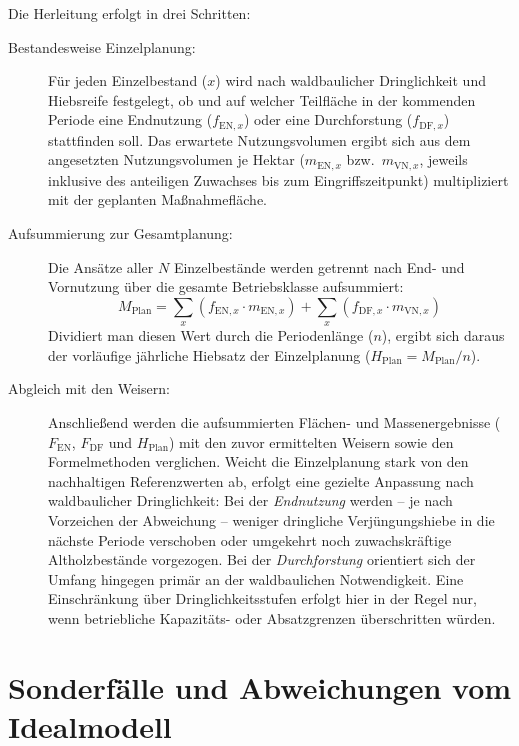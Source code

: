 \documentclass[twocolumn, paper=a4, fontsize=10pt]{scrartcl}
\begin{document}
Die Herleitung erfolgt in drei Schritten:
\begin{description}
\item[Bestandesweise Einzelplanung:] Für jeden Einzelbestand ($x$) wird nach waldbaulicher Dringlichkeit und Hiebsreife festgelegt, ob und auf welcher Teilfläche in der kommenden Periode eine Endnutzung ($f_{\text{EN},x}$) oder eine Durchforstung ($f_{\text{DF},x}$) stattfinden soll. Das erwartete Nutzungsvolumen ergibt sich aus dem angesetzten Nutzungsvolumen je Hektar ($m_{\text{EN},x}$ bzw.\ $m_{\text{VN},x}$, jeweils inklusive des anteiligen Zuwachses bis zum Eingriffszeitpunkt) multipliziert mit der geplanten Maßnahmefläche.

\item[Aufsummierung zur Gesamtplanung:] Die Ansätze aller $N$ Einzelbestände werden getrennt nach End- und Vornutzung über die gesamte Betriebsklasse aufsummiert:
\begin{equation}
M_{\text{Plan}} = \sum_x \left( f_{\text{EN},x} \cdot m_{\text{EN},x} \right) + \sum_x \left( f_{\text{DF},x} \cdot m_{\text{VN},x} \right)
\end{equation}
Dividiert man diesen Wert durch die Periodenlänge ($n$), ergibt sich daraus der vorläufige jährliche Hiebsatz der Einzelplanung ($H_{\text{Plan}} = M_{\text{Plan}} / n$).

\item[Abgleich mit den Weisern:] Anschließend werden die aufsummierten Flächen- und Massenergebnisse ($F_{\text{EN}}$, $F_{\text{DF}}$ und $H_{\text{Plan}}$) mit den zuvor ermittelten Weisern sowie den Formelmethoden verglichen. Weicht die Einzelplanung stark von den nachhaltigen Referenzwerten ab, erfolgt eine gezielte Anpassung nach waldbaulicher Dringlichkeit: Bei der \emph{Endnutzung} werden -- je nach Vorzeichen der Abweichung -- weniger dringliche Verjüngungshiebe in die nächste Periode verschoben oder umgekehrt noch zuwachskräftige Altholzbestände vorgezogen. Bei der \emph{Durchforstung} orientiert sich der Umfang hingegen primär an der waldbaulichen Notwendigkeit. Eine Einschränkung über Dringlichkeitsstufen erfolgt hier in der Regel nur, wenn betriebliche Kapazitäts- oder Absatzgrenzen überschritten würden.
\end{description}

\section{Sonderfälle und Abweichungen vom Idealmodell}
\end{document}

